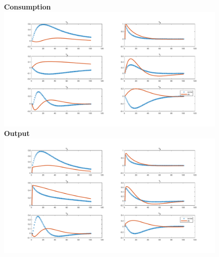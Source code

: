\documentclass[12pt,reqno]{article}
\numberwithin{equation}{section}
\begin{document}
\begin{figure}[H]
\textbf{Consumption}\\
\includegraphics[scale=0.4]{rise_impresp_cons.pdf}\\
\textbf{Output}\\
\includegraphics[scale=0.4]{rise_impresp_output.pdf}\\
\end{figure}
\end{document}
